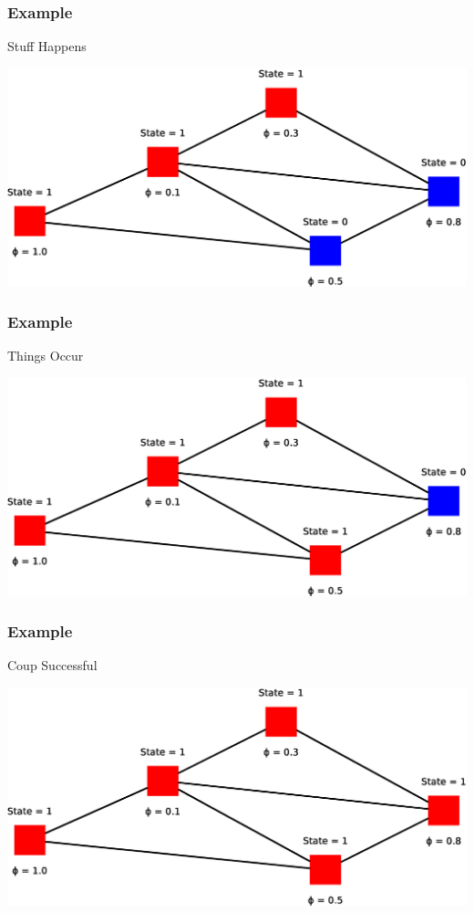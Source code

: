 \begin{frame}
    \frametitle{Example}
    \begin{itemize}
        \gitem Stuff Happens
    \end{itemize}
    \vspace{8.8pt}
    \includegraphics[width=\textwidth]{img/model7}
    \vfill
\end{frame}

\begin{frame}
    \frametitle{Example}
    \begin{itemize}
        \gitem Things Occur
    \end{itemize}
    \vspace{8.8pt}
    \includegraphics[width=\textwidth]{img/model8}
    \vfill
\end{frame}

\begin{frame}
    \frametitle{Example}
    \begin{itemize}
        \gitem Coup Successful
    \end{itemize}
    \vspace{8.8pt}
    \includegraphics[width=\textwidth]{img/model9}
    \vfill
\end{frame}
